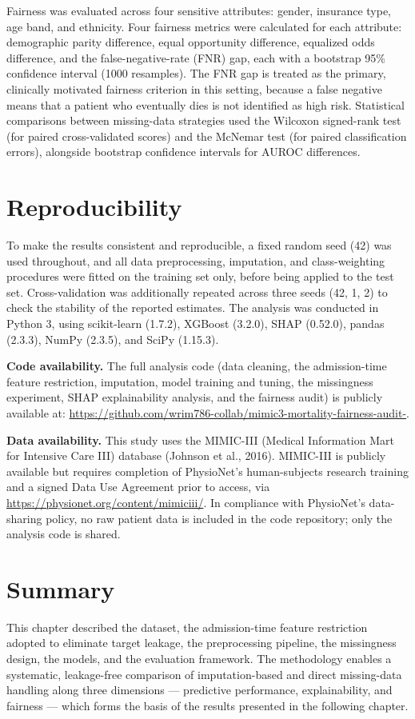 \documentclass[12pt,a4paper]{report}
\begin{document}
Fairness was evaluated across four sensitive attributes: gender, insurance type, age band, and ethnicity. Four fairness metrics were calculated for each attribute: demographic parity difference, equal opportunity difference, equalized odds difference, and the false-negative-rate (FNR) gap, each with a bootstrap 95\% confidence interval (1000 resamples). The FNR gap is treated as the primary, clinically motivated fairness criterion in this setting, because a false negative means that a patient who eventually dies is not identified as high risk. Statistical comparisons between missing-data strategies used the Wilcoxon signed-rank test (for paired cross-validated scores) and the McNemar test (for paired classification errors), alongside bootstrap confidence intervals for AUROC differences.


\section{Reproducibility}
To make the results consistent and reproducible, a fixed random seed (42) was used throughout, and all data preprocessing, imputation, and class-weighting procedures were fitted on the training set only, before being applied to the test set. Cross-validation was additionally repeated across three seeds (42, 1, 2) to check the stability of the reported estimates. The analysis was conducted in Python 3, using scikit-learn (1.7.2), XGBoost (3.2.0), SHAP (0.52.0), pandas (2.3.3), NumPy (2.3.5), and SciPy (1.15.3).

\textbf{Code availability.} The full analysis code (data cleaning, the admission-time feature restriction, imputation, model training and tuning, the missingness experiment, SHAP explainability analysis, and the fairness audit) is publicly available at: \url{https://github.com/wrim786-collab/mimic3-mortality-fairness-audit-}.

\textbf{Data availability.} This study uses the MIMIC-III (Medical Information Mart for Intensive Care III) database (Johnson et al., 2016). MIMIC-III is publicly available but requires completion of PhysioNet's human-subjects research training and a signed Data Use Agreement prior to access, via \url{https://physionet.org/content/mimiciii/}. In compliance with PhysioNet's data-sharing policy, no raw patient data is included in the code repository; only the analysis code is shared.


\section{Summary}
This chapter described the dataset, the admission-time feature restriction adopted to eliminate target leakage, the preprocessing pipeline, the missingness design, the models, and the evaluation framework. The methodology enables a systematic, leakage-free comparison of imputation-based and direct missing-data handling along three dimensions --- predictive performance, explainability, and fairness --- which forms the basis of the results presented in the following chapter.
\end{document}

